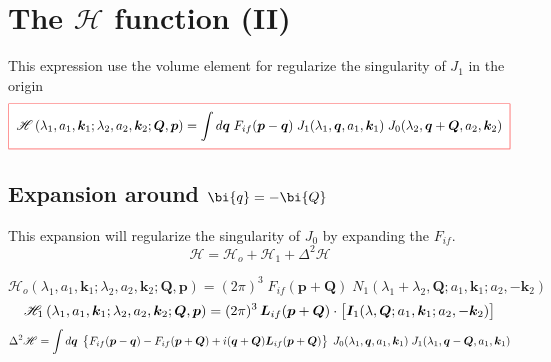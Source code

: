 \section{The $\mathcal{H}$ function (II)}
This expression use the volume element for regularize the singularity
of $J_{1}$ in the origin
%
\[
  \fbeq{
\mathcal{H} \left( \lambda_{1},a_{1},\bm{k}_{1} ; \lambda_{2},a_{2},
\bm{k}_{2}; \bm{Q}, \bm{p} \right) = \int d \bm{q} \; F_{if}( \bm{p}
- \bm{q} ) \;
 J_{1}( \lambda_{1}, \bm{q}, a_{1}, \bm{k}_{1} )\;
 J_{0}( \lambda_{2}, \bm{q} + \bm{Q}, a_{2}, \bm{k}_{2} )
  }
\]

\subsection{Expansion around $\bi{q} = - \bi{Q}$}
This expansion will regularize the singularity of $J_{0}$ by expanding
the $F_{if}$.
\[
\mathcal{H} = \mathcal{H}_{o} + \mathcal{H}_{1} + \Delta^{2}
\mathcal{H}
\]

\begin{equation}\label{QR:Hc}
\mathcal{H}_{o} \left( \lambda_{1},a_{1},\bm{k}_{1} ; \lambda_{2},
a_{2}, \bm{k}_{2} ; \bm{Q}, \bm{p} \right) = (2 \pi)^{3} \;
F_{if}(\bm{p} + \bm{Q}) \; N_{1} \left(\lambda_{1}+\lambda_{2}, \bm{Q}
; a_{1}, \bm{k}_{1} ; a_{2}, - \bm{k}_{2} \right)
\end{equation}
%
\[
\mathcal{H}_{1}\left( \lambda_{1},a_{1},\bm{k}_{1} ; \lambda_{2},
a_{2}, \bm{k}_{2}; \bm{Q}, \bm{p} \right)= (2 \pi)^{3} \, \bm{L}_{if}
(\bm{p} + \bm{Q}) \cdot  \left[ \bm{I}_{1}(\lambda,\bm{Q};
a_{1},\bm{k}_{1}; a_{2},-\bm{k}_{2} )  \vstretch \right]
\]
%
\[
\Delta^{2} \mathcal{H} = \int d \bm{q} \; \left\{ F_{if}( \bm{p} -
\bm{q} ) - F_{if}(\bm{p} + \bm{Q}) + i (\bm{q}+\bm{Q})
\bm{L}_{if}(\bm{p} + \bm{Q}) \vstretch\right\} \;
 J_{0}( \lambda_{1}, \bm{q} , a_{1}, \bm{k}_{1} ) \;
 J_{1}( \lambda_{1}, \bm{q} - \bm{Q}, a_{1}, \bm{k}_{1} )
\]

